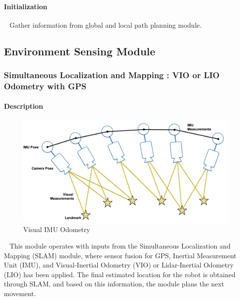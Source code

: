 \documentclass[12pt]{article}
\begin{document}
            \paragraph{Initialization}   
                ~\newline
                Gather information from global and local path planning module.
    
    \subsection{Environment Sensing Module}
        \subsubsection{Simultaneous Localization and Mapping : VIO or LIO Odometry with GPS}
            \paragraph{Description}
                \begin{figure}[H]
                    \centering
                    \includegraphics[width=\textwidth,height=\textheight,keepaspectratio]{../vio.png}
                    \caption{Visual IMU Odometry}
                \end{figure}
                ~\newline
                This module operates with inputs from the Simultaneous Localization and Mapping (SLAM) module, where sensor fusion for GPS, Inertial Measurement Unit (IMU), and Visual-Inertial Odometry (VIO) or Lidar-Inertial Odometry (LIO) has been applied. The final estimated location for the robot is obtained through SLAM, and based on this information, the module plans the next movement. 
                
\end{document}
